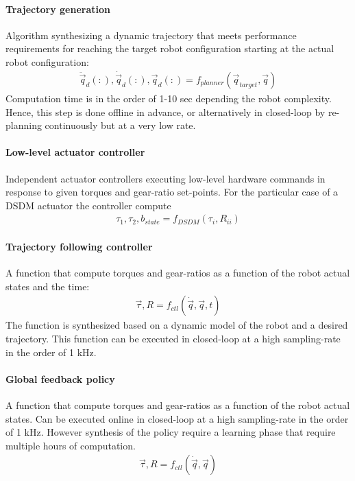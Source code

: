 \paragraph{Trajectory generation} Algorithm synthesizing a dynamic trajectory that meets performance requirements for reaching the target robot configuration starting at the actual robot configuration: 
%
\begin{align}
  \ddot{\vec{q}}_d(:),\dot{\vec{q}}_d(:),\vec{q}_d(:) = f_{planner}(\vec{q}_{target}, \vec{q})
	\label{eq:trajgen}
\end{align}
%
Computation time is in the order of 1-10 sec depending the robot complexity. Hence, this step is done offline in advance, or alternatively in closed-loop by re-planning continuously but at a very low rate. 

\paragraph{Low-level actuator controller} Independent actuator controllers executing low-level hardware commands in response to given torques and gear-ratio set-points. For the particular case of a DSDM actuator the controller compute 
%
\begin{align}
  \tau_1 , \tau_2 , b_{state} = f_{DSDM}(\tau_i, R_{ii})
	\label{eq:low-level-dsdm}
\end{align}
%

\paragraph{Trajectory following controller} A function that compute torques and gear-ratios as a function of the robot actual states and the time:
%
\begin{align}
  \vec{\tau}, R = f_{ctl}(\dot{\vec{q}}, \vec{q} , t)
	\label{eq:trajctl}
\end{align}
%
 The function is synthesized based on a dynamic model of the robot and a desired trajectory. This function can be executed in closed-loop at a high sampling-rate in the order of 1 kHz.

\paragraph{Global feedback policy} A function that compute torques and gear-ratios as a function of the robot actual states. Can be executed online in closed-loop at a high sampling-rate in the order of 1 kHz. However synthesis of the policy require a learning phase that require multiple hours of computation. 
%
\begin{align}
  \vec{\tau}, R = f_{ctl}(\dot{\vec{q}}, \vec{q})
	\label{eq:globctl}
\end{align}
%


